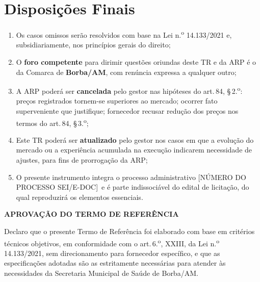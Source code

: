 \documentclass[12pt,a4paper]{article}
\newcommand{\art}[1]{art.\,#1}
\newcommand{\procNum}{[NÚMERO DO PROCESSO SEI/E-DOC]}
\begin{document}
\section{Disposições Finais}

\begin{enumerate}
  \item Os casos omissos serão resolvidos com base na Lei n.\textsuperscript{o}
    14.133/2021 e, subsidiariamente, nos princípios gerais do direito;
  \item O \textbf{foro competente} para dirimir questões oriundas deste TR e da ARP
    é o da Comarca de \textbf{Borba/AM}, com renúncia expressa a qualquer outro;
  \item A ARP poderá ser \textbf{cancelada} pelo gestor nas hipóteses do
    \art{84}, \S\,2.\textsuperscript{o}: preços registrados tornem-se superiores ao
    mercado; ocorrer fato superveniente que justifique; fornecedor recusar redução dos
    preços nos termos do \art{84}, \S\,3.\textsuperscript{o};
  \item Este TR poderá ser \textbf{atualizado} pelo gestor nos casos em que a
    evolução do mercado ou a experiência acumulada na execução indicarem necessidade
    de ajustes, para fins de prorrogação da ARP;
  \item O presente instrumento integra o processo administrativo \procNum\ e é
    parte indissociável do edital de licitação, do qual reproduzirá os elementos
    essenciais.
\end{enumerate}

\vspace{1.5cm}

\begin{conclusabox}
\begin{center}
  \textbf{\color{navy}\large APROVAÇÃO DO TERMO DE REFERÊNCIA}
\end{center}
\smallskip
Declaro que o presente Termo de Referência foi elaborado com base em critérios
técnicos objetivos, em conformidade com o \art{6.\textsuperscript{o}}, XXIII, da
Lei n.\textsuperscript{o} 14.133/2021, sem direcionamento para fornecedor
específico, e que as especificações adotadas são as estritamente necessárias para
atender às necessidades da Secretaria Municipal de Saúde de Borba/AM.
\end{conclusabox}
\end{document}
